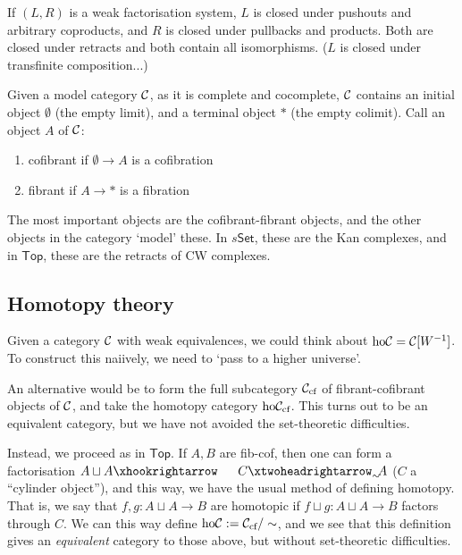 \documentclass[11pt]{article}
\begin{document}
\begin{JeremyModelCategories}
\begin{defn*}
\begin{exmps*}
\end{exmps*}

\end{defn*}\begin{prop*}
If $(L,R)$ is a weak factorisation system, $L$ is closed under pushouts and arbitrary coproducts, and $R$ is closed under pullbacks and products. Both are closed under retracts and both contain all isomorphisms. ($L$ is closed under transfinite composition...)
\end{prop*}
Given a model category $\mathcal{C}$, as it is complete and cocomplete, $\mathcal{C}$ contains an initial object $\emptyset$ (the empty limit), and a terminal object $*$ (the empty colimit). Call an object $A$ of $\mathcal{C}$:
\begin{enumerate}\squishlist
\item cofibrant if $\emptyset\to A$ is a cofibration
\item fibrant if $A\to *$ is a fibration
\end{enumerate}
The most important objects are the cofibrant-fibrant objects, and the other objects in the category `model' these. In $s\mathsf{Set}$, these are the Kan complexes, and in $\mathsf{Top}$, these are the retracts of CW complexes.

\subsection*{Homotopy theory}
Given a category $\mathcal{C}$ with weak equivalences, we could think about $\textup{ho}\mathcal{C}=\mathcal{C}[W^{-1}]$. To construct this naiively, we need to `pass to a higher universe'. 

An alternative would be to form the full subcategory $\mathcal{C}_{\textup{cf}}$ of fibrant-cofibrant objects of $\mathcal{C}$, and take the homotopy category $\textup{ho}\mathcal{C}_{\textup{cf}}$. This turns out to be an equivalent category, but we have not avoided the set-theoretic difficulties.

Instead, we proceed as in $\mathsf{Top}$. If $A,B$ are fib-cof, then one can form a factorisation $A\sqcup A\cofibration C \acyclicfibration A$ ($C$ a ``cylinder object''), and this way, we have the usual method of defining homotopy. That is, we say that $f,g:A\sqcup A\to B$ are homotopic if $f\sqcup g:A\sqcup A\to B$ factors through $C$. We can this way define $\textup{ho}\mathcal{C}:=\mathcal{C}_{\textup{cf}}/\sim$, and we see that this definition gives an \emph{equivalent} category to those above, but without set-theoretic difficulties.


\end{JeremyModelCategories}
\end{document}
